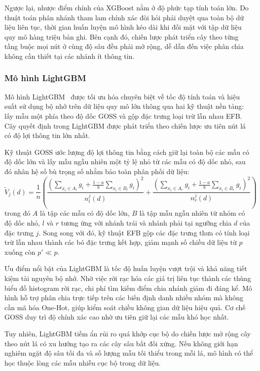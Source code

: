 Ngược lại, nhược điểm chính của XGBoost nằm ở độ phức tạp tính toán lớn. Do thuật toán phân nhánh tham lam chính xác đòi hỏi phải duyệt qua toàn bộ dữ liệu liên tục, thời gian huấn luyện mô hình kéo dài khi đối mặt với tập dữ liệu quy mô hàng triệu bản ghi. Bên cạnh đó, chiến lược phát triển cây theo từng tầng buộc mọi nút ở cùng độ sâu đều phải mở rộng, dễ dẫn đến việc phân chia không cần thiết tại các nhánh ít thông tin.

\subsubsection{Mô hình LightGBM}

Mô hình LightGBM~\cite{lightgbm} được tối ưu hóa chuyên biệt về tốc độ tính toán và hiệu suất sử dụng bộ nhớ trên dữ liệu quy mô lớn thông qua hai kỹ thuật nền tảng: lấy mẫu một phía theo độ dốc GOSS và gộp đặc trưng loại trừ lẫn nhau EFB. Cây quyết định trong LightGBM được phát triển theo chiến lược ưu tiên nút lá có độ lợi thông tin lớn nhất.

Kỹ thuật GOSS ước lượng độ lợi thông tin bằng cách giữ lại toàn bộ các mẫu có độ dốc lớn và lấy mẫu ngẫu nhiên một tỷ lệ nhỏ từ các mẫu có độ dốc nhỏ, sau đó nhân hệ số bù trọng số nhằm bảo toàn phân phối dữ liệu:
\begin{equation*}
    \widetilde{V}_j(d) = \frac{1}{n} \left( \frac{\left(\sum_{x_i \in A_l} g_i + \frac{1-a}{b} \sum_{x_i \in B_l} g_i\right)^2}{n_l^j(d)} + \frac{\left(\sum_{x_i \in A_r} g_i + \frac{1-a}{b} \sum_{x_i \in B_r} g_i\right)^2}{n_r^j(d)} \right)
\end{equation*}
trong đó $A$ là tập các mẫu có độ dốc lớn, $B$ là tập mẫu ngẫu nhiên từ nhóm có độ dốc nhỏ, $l$ và $r$ tương ứng với nhánh trái và nhánh phải tại ngưỡng chia $d$ của đặc trưng $j$. Song song với đó, kỹ thuật EFB gộp các đặc trưng thưa có tính loại trừ lẫn nhau thành các bó đặc trưng kết hợp, giảm mạnh số chiều dữ liệu từ $p$ xuống còn $p' \ll p$.

Ưu điểm nổi bật của LightGBM là tốc độ huấn luyện vượt trội và khả năng tiết kiệm tài nguyên bộ nhớ. Nhờ việc rời rạc hóa các giá trị liên tục thành các thùng biểu đồ histogram rời rạc, chi phí tìm kiếm điểm chia nhánh giảm đi đáng kể. Mô hình hỗ trợ phân chia trực tiếp trên các biến định danh nhiều nhóm mà không cần mã hóa One-Hot, giúp kiểm soát chiều không gian dữ liệu hiệu quả. Cơ chế GOSS duy trì độ chính xác cao nhờ ưu tiên giữ lại các mẫu khó học nhất.

Tuy nhiên, LightGBM tiềm ẩn rủi ro quá khớp cục bộ do chiến lược mở rộng cây theo nút lá có xu hướng tạo ra các cây sâu bất đối xứng. Nếu không giới hạn nghiêm ngặt độ sâu tối đa và số lượng mẫu tối thiểu trong mỗi lá, mô hình có thể học thuộc lòng các mẫu nhiễu cục bộ trong dữ liệu.

